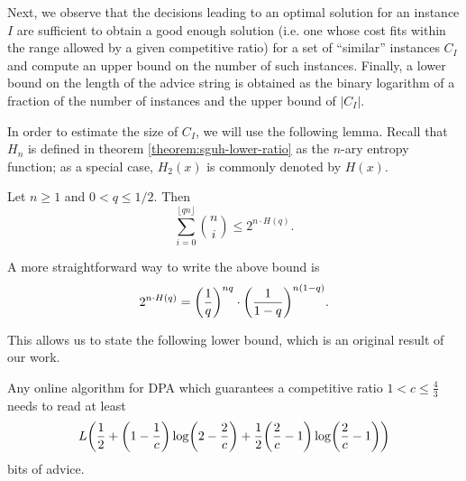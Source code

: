 Next, we observe that the decisions leading to an optimal solution for an
instance $I$ are sufficient to obtain a good enough solution (i.e. one
whose cost fits within the range allowed by a given competitive ratio) for
a set of ``similar'' instances $C_I$ and compute an upper bound on the
number of such instances. Finally, a lower bound on the length of the
advice string is obtained as the binary logarithm of a fraction of the
number of instances and the upper bound of $|C_I|$.

In order to estimate the size of $C_I$, we will use the following lemma.
Recall that $H_n$ is defined in theorem \ref{theorem:sguh-lower-ratio} as
the $n$-ary entropy function; as a special case, $H_2(x)$ is commonly
denoted by $H(x)$.

\begin{lemma}\label{lemma:hamming}
    Let $n \geq 1$ and $0 < q \leq 1/2$. Then
    $$
        \sum_{i=0}^{\lfloor{}qn\rfloor} \binom{n}{i} \leq
        2^{n\cdot{}H(q)}.
    $$
\end{lemma}

A more straightforward way to write the above bound is
$$
    2^{n\cdot{}H(q)} = \paren*{\frac{1}{q}}^{nq} \cdot
    \paren*{\frac{1}{1-q}}^{n(1-q)}.
$$

This allows us to state the following lower bound, which is an original
result of our work.

\begin{theorem}\label{theorem:dpa-lower-bound-half}
    Any online algorithm for DPA which guarantees a competitive ratio $1 <
    c \leq \frac{4}{3}$ needs to read at least
    $$
        L \paren*{\frac{1}{2} +
        \paren*{1-\frac{1}{c}}\log\paren*{2-\frac{2}{c}} +
        \frac{1}{2}\paren*{\frac{2}{c}-1}\log\paren*{\frac{2}{c}-1}}
    $$
    bits of advice.
\end{theorem}

